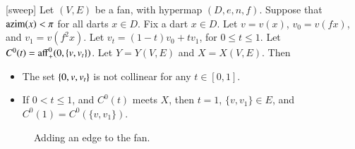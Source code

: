 \begin{lemma}[sweep]\label{lemma:sweep}  
Let $(V,E)$ be a fan, with hypermap $(D,e,n,f)$.  
Suppose that ${\operatorname{azim}}(x)<\pi$
for all darts $x\in D$.  Fix a dart $x\in D$.
Let $v = v(x)$, $v_0 = v(f x)$,
and $v_1 = v(f^2 x)$.  Let $v_t = (1-t) v_0 + t v_1$, for
$0\le t\le 1$.  Let $C^0(t) = {\operatorname{aff}}_+^0(0,\{v,v_t\})$.
Let $Y = Y(V,E)$ and $X = X(V,E)$.
Then
\begin{itemize}
\item The set $\{0,v,v_t\}$ is not collinear for any $t\in[0,1]$.
\item If $0 < t \le 1$, and $C^0(t)$ meets $X$, then $t=1$, $\{v,v_1\}\in E$, and $C^0(1) = C^0(\{v,v_1\})$.
\end{itemize}
\end{lemma}


\begin{figure}[htb]
  \centering
  \caption{Adding an edge to the fan.}
  \label{fig:vt}
\end{figure}


